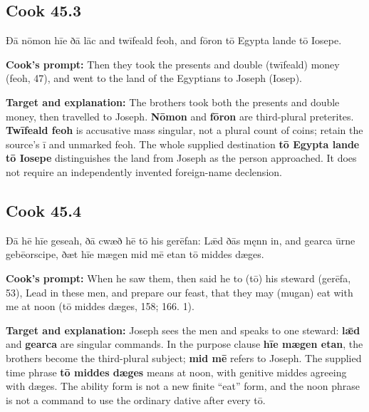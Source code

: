 \par\begin{minipage}{\linewidth}\raggedright
\subsection*{Cook 45.3}

Ðā nōmon hīe ðā lāc and twīfeald feoh, and fōron tō Egypta lande tō Iosepe.

\textbf{Cook’s prompt:} Then they took the presents and double (twīfeald) money (feoh, 47), and went to the land of the Egyptians to Joseph (Iosep).

\textbf{Target and explanation:} The brothers took both the presents and double money, then travelled to Joseph. \textbf{Nōmon} and \textbf{fōron} are third-plural preterites. \textbf{Twīfeald feoh} is accusative mass singular, not a plural count of coins; retain the source’s ī and unmarked feoh. The whole supplied destination \textbf{tō Egypta lande tō Iosepe} distinguishes the land from Joseph as the person approached. It does not require an independently invented foreign-name declension.

\end{minipage}\par\addvspace{4pt}

\par\begin{minipage}{\linewidth}\raggedright
\subsection*{Cook 45.4}

Ðā hē hīe geseah, ðā cwæð hē tō his gerēfan: Lǣd ðās męnn in, and gearca ūrne gebēorscipe, ðæt hīe mægen mid mē etan tō middes dæges.

\textbf{Cook’s prompt:} When he saw them, then said he to (tō) his steward (gerēfa, 53), Lead in these men, and prepare our feast, that they may (mugan) eat with me at noon (tō middes dæges, 158; 166. 1).

\textbf{Target and explanation:} Joseph sees the men and speaks to one steward: \textbf{lǣd} and \textbf{gearca} are singular commands. In the purpose clause \textbf{hīe mægen etan}, the brothers become the third-plural subject; \textbf{mid mē} refers to Joseph. The supplied time phrase \textbf{tō middes dæges} means at noon, with genitive middes agreeing with dæges. The ability form is not a new finite “eat” form, and the noon phrase is not a command to use the ordinary dative after every tō.

\end{minipage}\par\addvspace{4pt}

